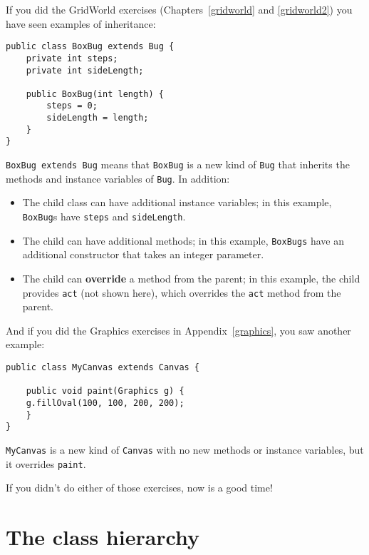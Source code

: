 \documentclass[12pt]{book}
\theoremstyle{definition}
\begin{document}
If you did the GridWorld exercises (Chapters~\ref{gridworld} and
\ref{gridworld2}) you have seen examples of inheritance:

\begin{lstlisting}
public class BoxBug extends Bug {
    private int steps;
    private int sideLength;

    public BoxBug(int length) {
        steps = 0;
        sideLength = length;
    }
}
\end{lstlisting}

{\tt BoxBug extends Bug} means that {\tt BoxBug} is a new
kind of {\tt Bug} that inherits the methods and instance
variables of {\tt Bug}.  In addition:

\begin{itemize}

\item The child class can have additional instance variables; in
this example, {\tt BoxBug}s have {\tt steps} and {\tt sideLength}.

\item The child can have additional methods; in this example,
{\tt BoxBugs} have an additional constructor that takes an integer
parameter.

\item The child can {\bf override} a method from the parent; in
this example, the child provides {\tt act} (not shown here),
which overrides the {\tt act} method from the parent.

\end{itemize}

And if you did the Graphics exercises in Appendix~\ref{graphics}, you
saw another example:

\begin{lstlisting}
public class MyCanvas extends Canvas {

    public void paint(Graphics g) {
	g.fillOval(100, 100, 200, 200);
    }
}
\end{lstlisting}

{\tt MyCanvas} is a new kind of {\tt Canvas} with no new methods
or instance variables, but it overrides {\tt paint}.

If you didn't do either of those exercises, now is a good time!


\section{The class hierarchy}
\end{document}
